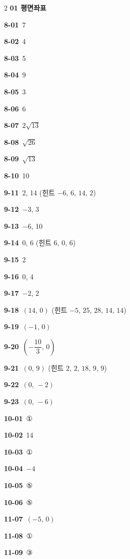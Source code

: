\documentclass[10pt,a4paper]{article}
\begin{document}
\begin{multicols}{2}\small
\noindent\textbf{01 평면좌표}\par\smallskip
\noindent\textbf{8-01}\ 7\par
\noindent\textbf{8-02}\ 4\par
\noindent\textbf{8-03}\ 5\par
\noindent\textbf{8-04}\ 9\par
\noindent\textbf{8-05}\ 3\par
\noindent\textbf{8-06}\ 6\par
\noindent\textbf{8-07}\ $2\sqrt{13}$\par
\noindent\textbf{8-08}\ $\sqrt{26}$\par
\noindent\textbf{8-09}\ $\sqrt{13}$\par
\noindent\textbf{8-10}\ 10\par
\noindent\textbf{9-11}\ 2, 14 (힌트 $-6$, $6$, $14$, $2$)\par
\noindent\textbf{9-12}\ $-3$, 3\par
\noindent\textbf{9-13}\ $-6$, 10\par
\noindent\textbf{9-14}\ 0, 6 (힌트 $6$, $0$, $6$)\par
\noindent\textbf{9-15}\ 2\par
\noindent\textbf{9-16}\ 0, 4\par
\noindent\textbf{9-17}\ $-2$, $2$\par
\noindent\textbf{9-18}\ $(14,\,0)$ (힌트 $-5$, $25$, $28$, $14$, $14$)\par
\noindent\textbf{9-19}\ $(-1,\,0)$\par
\noindent\textbf{9-20}\ $\left(-\dfrac{10}{3},\,0\right)$\par
\noindent\textbf{9-21}\ $(0,\,9)$ (힌트 $2$, $2$, $18$, $9$, $9$)\par
\noindent\textbf{9-22}\ $(0,\,-2)$\par
\noindent\textbf{9-23}\ $(0,\,-6)$\par
\noindent\textbf{10-01}\ ①\par
\noindent\textbf{10-02}\ 14\par
\noindent\textbf{10-03}\ ①\par
\noindent\textbf{10-04}\ $-4$\par
\noindent\textbf{10-05}\ ⑤\par
\noindent\textbf{10-06}\ ⑤\par
\noindent\textbf{11-07}\ $(-5,\,0)$\par
\noindent\textbf{11-08}\ ①\par
\noindent\textbf{11-09}\ ③\par

\end{multicols}
\end{document}
